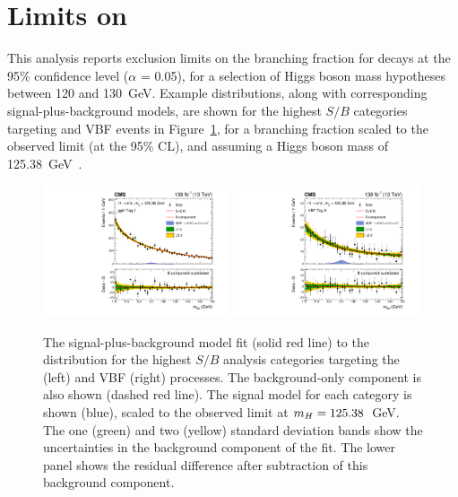 \section{Limits on \BHee}

This analysis reports exclusion limits on the branching fraction for \Hee decays at the 95\% confidence level ($\alpha$ = 0.05), for a selection of Higgs boson mass hypotheses between 120 and 130~GeV. Example \mee distributions, along with corresponding signal-plus-background models, are shown for the highest $S/B$ categories targeting \ggH and VBF events in Figure~\ref{fig:hee_S_plus_B_plots}, for a \Hee branching fraction scaled to the observed limit (at the 95\% CL), and assuming a Higgs boson mass of 125.38~GeV~\cite{CMS_Hgg_Hmass}. 

\begin{figure}[htbp!]
\centering
\includegraphics[width=0.49\textwidth]{Figures/Hee/Results/SPlusBModels/gghcat0_CMS_hgg_mass_paper.pdf}\hfill%
\includegraphics[width=0.49\textwidth]{Figures/Hee/Results/SPlusBModels/vbfcat0_CMS_hgg_mass_paper.pdf}\hfill%
\caption[The observed dielectron invariant mass distribution for the \ggH Tag 0 and VBF Tag 0 analysis categories.]{The signal-plus-background model fit (solid red line) to the \mee distribution for the highest $S/B$ analysis categories targeting the \ggH (left) and VBF (right) processes. The background-only component is also shown (dashed red line). The signal model for each category is shown (blue), scaled to the observed limit at $m_{H}=125.38$~GeV. The one (green) and two (yellow) standard deviation bands show the uncertainties in the background component of the fit. The lower panel shows the residual difference after subtraction of this background component.}
\label{fig:hee_S_plus_B_plots}
\end{figure}

